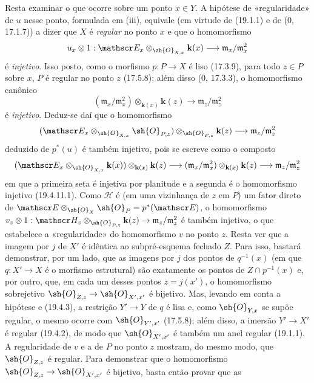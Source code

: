 Resta examinar o que ocorre sobre um ponto $x\in Y$. A hipótese de «regularidade» de $u$ nesse ponto, formulada em (iii), equivale (em virtude de (19.1.1) e de ($0$, 17.1.7)) a dizer que $X$ é \emph{regular} no ponto $x$ e que o homomorfismo
\[
  u_x\otimes1:\mathscr E_x\otimes_{\sh{O}_{X,x}}\mathbf k(x)\longrightarrow\mathfrak m_x/\mathfrak m_x^2
\]
é \emph{injetivo}. Isso posto, como o morfismo $p:P\to X$ é liso (17.3.9), para todo $z\in P$ sobre $x$, $P$ é regular no ponto $z$ (17.5.8); além disso ($0$, 17.3.3), o homomorfismo canônico
\begin{equation}
  (\mathfrak m_x/\mathfrak m_x^2)\otimes_{\mathbf k(x)}\mathbf k(z)\longrightarrow\mathfrak m_z/\mathfrak m_z^2
  \tag{19.4.11.1}\label{IV.19.4.11.1}
\end{equation}
é \emph{injetivo}. Deduz-se daí que o homomorfismo
\[
  (\mathscr E_x\otimes_{\sh{O}_{X,x}}\sh{O}_{P,z})\otimes_{\sh{O}_{P,z}}\mathbf k(z)\longrightarrow\mathfrak m_z/\mathfrak m_z^2
\]
deduzido de $p^*(u)$ é também injetivo, pois se escreve como o composto
\[
  (\mathscr E_x\otimes_{\sh{O}_{X,x}}\mathbf k(x))\otimes_{\mathbf k(x)}\mathbf k(z)\longrightarrow(\mathfrak m_x/\mathfrak m_x^2)\otimes_{\mathbf k(x)}\mathbf k(z)\longrightarrow\mathfrak m_z/\mathfrak m_z^2
\]
em que a primeira seta é injetiva por planitude e a segunda é o homomorfismo injetivo (19.4.11.1). Como $\mathscr H$ é (em uma vizinhança de $z$ em $P$) um fator direto de $\mathscr E\otimes_{\sh{O}_X}\sh{O}_P=p^*(\mathscr E)$, o homomorfismo $v_z\otimes1:\mathscr H_z\otimes_{\sh{O}_{P,z}}\mathbf k(z)\to\mathfrak m_z/\mathfrak m_z^2$ é também injetivo, o que estabelece a «regularidade» do homomorfismo $v$ no ponto $z$. Resta ver que a imagem por $j$ de $X'$ é idêntica ao subpré-esquema fechado $Z$. Para isso, bastará demonstrar, por um lado, que as imagens por $j$ dos pontos de $q^{-1}(x)$ (em que $q:X'\to X$ é o morfismo estrutural) são exatamente os pontos de $Z\cap p^{-1}(x)$ e, por outro, que, em cada um desses pontos $z=j(x')$, o homomorfismo sobrejetivo $\sh{O}_{Z,z}\to\sh{O}_{X',x'}$ é bijetivo. Mas, levando em conta a hipótese e (19.4.3), a restrição $Y'\to Y$ de $q$ é lisa e, como $\sh{O}_{Y,x}$ se supõe regular, o mesmo ocorre com $\sh{O}_{Y',x'}$ (17.5.8); além disso, a imersão $Y'\to X'$ é regular (19.4.2), de modo que $\sh{O}_{X',x'}$ é também um anel regular (19.1.1). A regularidade de $v$ e a de $P$ no ponto $z$ mostram, do mesmo modo, que $\sh{O}_{Z,z}$ é regular. Para demonstrar que o homomorfismo $\sh{O}_{Z,z}\to\sh{O}_{X',x'}$ é bijetivo, basta então provar que as

